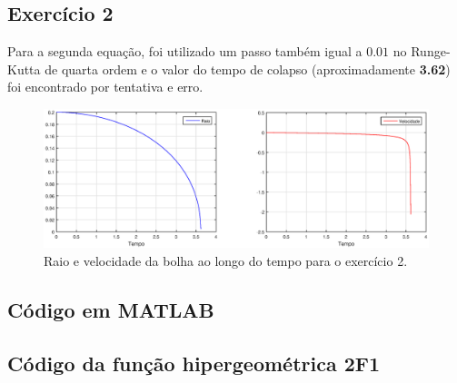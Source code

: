 \documentclass[10pt,a4paper]{article}
\begin{document}
	\subsection{Exercício 2}
	Para a segunda equação, foi utilizado um passo também igual a $0.01$ no Runge-Kutta de quarta ordem e o valor do tempo de colapso (aproximadamente \textbf{3.62}) foi encontrado por tentativa e erro.
	
	\begin{figure}[h!]
    \centering
      \includegraphics[width=1\linewidth]{figures/eq2-h0-01-t-3-62.eps}
      \caption{Raio e velocidade da bolha ao longo do tempo para o exercício 2.}
      \label{fig:raio2}
	\end{figure}
    
    \newpage
    \subsection{Código em MATLAB}
    
    \subsection{Código da função hipergeométrica 2F1}
    
	
\end{document}
